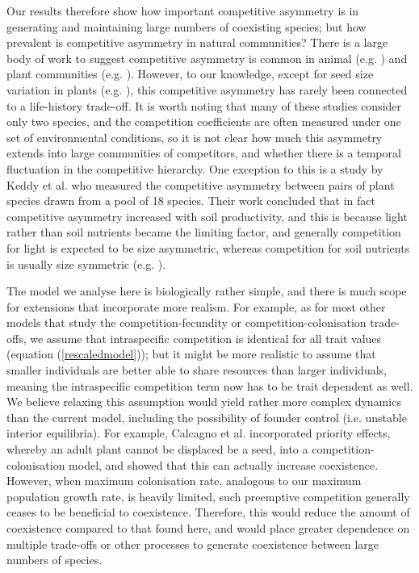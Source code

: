 Our results therefore show how important competitive asymmetry is in generating and maintaining large numbers of coexisting species; but how prevalent is competitive asymmetry in natural communities? There is a large body of work to suggest competitive asymmetry is common in animal (e.g. \cite{lawton1981asymmetrical, morin1988experimental,  resetarits1995competitive, costanzo2005asymmetrical}) and plant communities (e.g. \cite{weiner1990asymmetric, connolly1996asymmetric, keddy1997experimental}). However, to our knowledge, except for seed size variation in plants (e.g. \cite{turnbull1999seed}), this competitive asymmetry has rarely been connected to a life-history trade-off. It is worth noting that many of these studies consider only two species, and the competition coefficients are often measured under one set of environmental conditions, so it is not clear how much this asymmetry extends into large communities of competitors, and whether there is a temporal fluctuation in the competitive hierarchy. One exception to this is a study by Keddy et al. \cite{keddy1997experimental} who measured the competitive asymmetry between pairs of plant species drawn from a pool of 18 species. Their work concluded that in fact competitive asymmetry increased with soil productivity, and this is because light rather than soil nutrients became the limiting factor, and generally competition for light is expected to be size asymmetric, whereas competition for soil nutrients is usually size symmetric (e.g. \cite{weiner1990asymmetric}). 

The model we analyse here is biologically rather simple, and there is much scope for extensions that incorporate more realism. For example, as for most other models that study the competition-fecundity or competition-colonisation trade-offs, we assume that intraspecific competition is identical for all trait values (equation (\ref{rescaledmodel})); but it might be more realistic to assume that smaller individuals are better able to share resources than larger individuals, meaning the intraspecific competition term now has to be trait dependent as well.  We believe relaxing this assumption would yield rather more complex dynamics than the current model, including the possibility of founder control (i.e. unstable interior equilibria). For example, Calcagno et al. \cite{calcagno2006coexistence} incorporated priority effects, whereby an adult plant cannot be displaced be a seed, into a competition-colonisation model, and showed that this can actually increase coexistence. However, when maximum colonisation rate, analogous to our maximum population growth rate, is heavily limited, such preemptive competition generally ceases to be beneficial to coexistence. Therefore,  this would reduce the amount of coexistence compared to that found here, and would place greater dependence on multiple trade-offs or other processes to generate coexistence between large numbers of species. 

